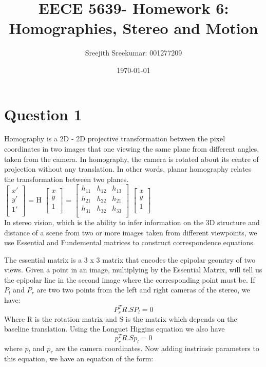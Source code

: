 \documentclass{article}
\title{EECE 5639- Homework 6: Homographies, Stereo and Motion}
\author{Sreejith Sreekumar: 001277209}
\date{\today}
\begin{document}
\maketitle

\section*{Question 1}
Homography is a 2D - 2D projective transformation between the pixel coordinates in two images that one
viewing the same plane from different angles, taken from the camera. In homography, the camera is rotated
about its centre of projection without any translation. In other words, planar homography relates the transformation between two planes. \\

$\begin{bmatrix}
    x'\\
    y'\\
    1'\\
\end{bmatrix}$ = H $\begin{bmatrix}
    x\\
    y\\
    1\\
\end{bmatrix}$ = $\begin{bmatrix}
    h_{11} &  h_{12} &  h_{13}\\
    h_{21} &  h_{22} &  h_{21}\\
    h_{31} &  h_{32} &  h_{33}\\
\end{bmatrix}$ $\begin{bmatrix}
    x\\
    y\\
    1\\
\end{bmatrix}$ \\

In stereo vision, which is the ability to infer information on the 3D structure and distance of a
scene from two or more images taken from different viewpoints, we use Essential and Fundemental matrices to
construct correspondence equations.

The essential matrix is a 3 x 3 matrix that encodes the epipolar geomtry of two views. Given a point
in an image, multiplying by the Essential Matrix, will tell us the epipolar line in the second image
where the corresponding point must be.
If $P_{l}$ and $P_{r}$ are two two points from the left and right cameras of the stereo, we have:
\[
P_{r}^{T} R.S P_{l} = 0
\]
Where R is the rotation matrix and S is the matrix which depends on the baseline translation. Using the
Longuet Higgins equation we also have
\[
p_{r}^{T} R.S p_{l} = 0
\]
where $p_{l}$ and $p_{r}$ are the camera coordinates. Now adding instrinsic parameters to this equation,
we have an equation of the form:
\end{document}
